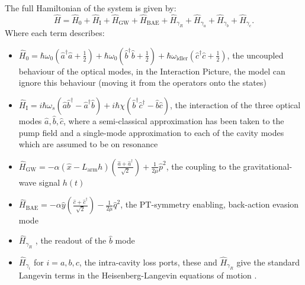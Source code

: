 The full Hamiltonian of the system is given by: $$\hat{H}=\hat{H}_0+\hat{H}_\mathrm{I}+\hat{H}_{\mathrm{GW}}+\hat{H}_{\mathrm{BAE}}+\hat{H}_{\gamma_R}+\hat{H}_{\gamma_a}+\hat{H}_{\gamma_b}+\hat{H}_{\gamma_c}.$$ Where each term describes:
\begin{itemize}
\item $\hat{H}_0=\hbar\omega_0(\hat{a}^\dagger\hat{a}+\frac{1}{2})+\hbar\omega_0(\hat{b}^\dagger\hat{b}+\frac{1}{2})+\hbar\omega_\mathrm{idler}(\hat{c}^\dagger\hat{c}+\frac{1}{2})$, the uncoupled behaviour of the optical modes, in the Interaction Picture, the model can ignore this behaviour (moving it from the operators onto the states)  %
\item $\hat{H}_\mathrm{I}=i\hbar\omega_s(\hat{a}\hat{b}^\dag-\hat{a}^\dag\hat{b})+i\hbar\chi(\hat{b}^\dag\hat{c}^\dag-\hat{b}\hat{c})$, the interaction of the three optical modes $\hat{a}, \hat{b}, \hat{c}$, where a semi-classical approximation has been taken to the pump field  and a single-mode approximation to each of the cavity modes which are assumed to be on resonance 
\item $\hat{H}_\mathrm{GW}=-\alpha (\hat{x}-L_\mathrm{arm}h)(\frac{\hat{a}+\hat{a}^\dag}{\sqrt{2}})+\frac{1}{2\mu}\hat{p}^2$,  the coupling to the gravitational-wave signal $h(t)$
\item $\hat{H}_{\mathrm{BAE}}=-\alpha \hat{y}(\frac{\hat{c}+\hat{c}^\dag}{\sqrt{2}})-\frac{1}{2\mu}\hat{q}^2$, the PT-symmetry enabling, back-action evasion  mode
\item $\hat{H}_{\gamma_R}$ , the readout of the $\hat{b}$ mode
\item $\hat{H}_{\gamma_i}$ for $i=a,b,c$, the intra-cavity loss ports, these and $\hat{H}_{\gamma_R}$ give the standard  Langevin terms in the Heisenberg-Langevin equations of motion .
\end{itemize}

